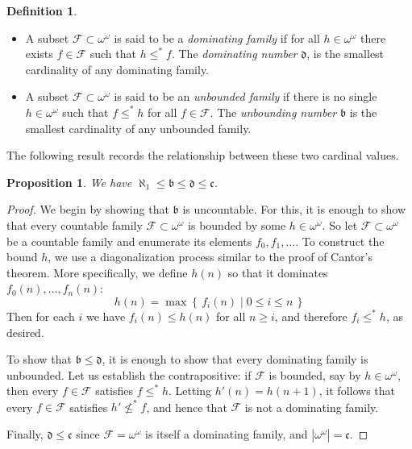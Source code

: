 \documentclass[11pt,oneside]{amsbook}
\newcommand{\set}[1]{\left\{\,#1\,\right\}}
\theoremstyle{definition}
\theoremstyle{plain}
\newtheorem{prop}[thm]{Proposition}
\theoremstyle{definition}
\newtheorem{defn}[thm]{Definition}
\theoremstyle{remark}
\numberwithin{equation}{section}
\numberwithin{figure}{section}
\begin{document}
\begin{defn}
  \begin{itemize}
  \item A subset $\mathcal F\subset\omega^\omega$ is said to be a \emph{dominating family} if for all $h\in\omega^\omega$ there exists $f\in\mathcal F$ such that $h\leq^*f$. The \emph{dominating number} $\mathfrak d$, is the smallest cardinality of any dominating family.
  \item A subset $\mathcal F\subset\omega^\omega$ is said to be an \emph{unbounded family} if there is no single $h\in\omega^\omega$ such that $f\leq^*h$ for all $f\in\mathcal F$. The \emph{unbounding number} $\mathfrak b$ is the smallest cardinality of any unbounded family.
  \end{itemize}
\end{defn}

The following result records the relationship between these two cardinal values.

\begin{prop}
  \label{prop:bd}
  We have $\aleph_1\leq\mathfrak{b}\leq\mathfrak{d}\leq\mathfrak{c}$.
\end{prop}
	
\begin{proof}
  We begin by showing that $\mathfrak{b}$ is uncountable. For this, it is enough to show that every countable family $\mathcal F\subset\omega^\omega$ is bounded by some $h\in\omega^\omega$. So let $\mathcal F\subset\omega^\omega$ be a countable family and enumerate its elements $f_0,f_1,\ldots$. To construct the bound $h$, we use a diagonalization process similar to the proof of Cantor's theorem. More specifically, we define $h(n)$ so that it dominates $f_0(n),\ldots,f_n(n)$:
\[h(n)=\max\set{f_i(n)\mid 0\leq i\leq n}
\]
Then for each $i$ we have $f_i(n)\leq h(n)$ for all $n\geq i$, and therefore $f_i\leq^*h$, as desired.

To show that $\mathfrak{b}\leq\mathfrak{d}$, it is enough to show that every dominating family is unbounded. Let us establish the contrapositive: if $\mathcal F$ is bounded, say by $h\in\omega^\omega$, then every $f\in\mathcal F$ satisfies $f\leq^*h$. Letting $h'(n)=h(n+1)$, it follows that every $f\in\mathcal F$ satisfies $h'\not\leq^*f$, and hence that $\mathcal F$ is not a dominating family.

Finally, $\mathfrak d\leq\mathfrak c$ since $\mathcal F=\omega^\omega$ is itself a dominating family, and $|\omega^\omega|=\mathfrak c$.
\end{proof}
\end{document}
